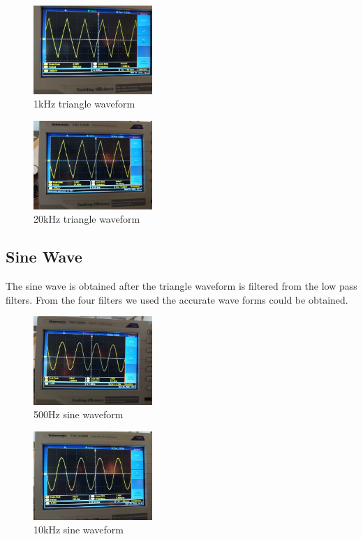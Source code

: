 \documentclass[11pt]{article}
\begin{document}
\begin{multicols}{2}
\begin{figure}[H]
    \centering
    \includegraphics[width=0.4\textwidth]{Triangle_1kHz.jpeg}
    \caption{1kHz triangle waveform}
    \label{fig:mesh6}
\end{figure}

\begin{figure}[H]
    \centering
    \includegraphics[width=0.4\textwidth]{Triangle_20kHz.jpeg}
    \caption{20kHz triangle waveform}
    \label{fig:mesh7}
\end{figure}

\subsection*{Sine Wave}

The sine wave is obtained after the triangle waveform is filtered from the low pass filters. From the four filters we used the accurate wave forms could be obtained.

\begin{figure}[H]
    \centering
    \includegraphics[width=0.4\textwidth]{Sine_500Hz.jpeg}
    \caption{500Hz sine waveform}
    \label{fig:mesh5}
\end{figure}

\begin{figure}[H]
    \centering
    \includegraphics[width=0.4\textwidth]{Sine_10kHz.jpeg}
    \caption{10kHz sine waveform}
    \label{fig:mesh6}
\end{figure}


\end{multicols}
\end{document}
